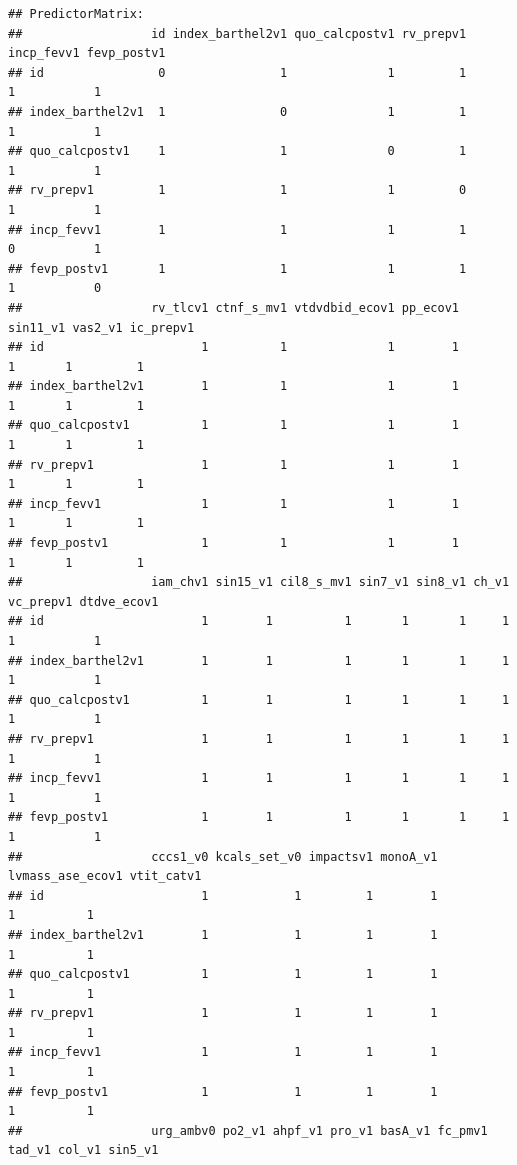 \documentclass[a4paper,10pt]{article}\usepackage[]{graphicx}\usepackage[]{xcolor}
\makeatletter
\newenvironment{kframe}{%
 \def\at@end@of@kframe{}%
 \ifinner\ifhmode%
  \def\at@end@of@kframe{\end{minipage}}%
  \begin{minipage}{\columnwidth}%
 \fi\fi%
 \def\FrameCommand##1{\hskip\@totalleftmargin \hskip-\fboxsep
 \colorbox{shadecolor}{##1}\hskip-\fboxsep
     \hskip-\linewidth \hskip-\@totalleftmargin \hskip\columnwidth}%
 \MakeFramed {\advance\hsize-\width
   \@totalleftmargin\z@ \linewidth\hsize
   \@setminipage}}%
 {\par\unskip\endMakeFramed%
 \at@end@of@kframe}
\newenvironment{knitrout}{}{} %
\makeatother
\begin{document}
\begin{knitrout}
\begin{kframe}
\begin{verbatim}
## PredictorMatrix:
##                  id index_barthel2v1 quo_calcpostv1 rv_prepv1 incp_fevv1 fevp_postv1
## id                0                1              1         1          1           1
## index_barthel2v1  1                0              1         1          1           1
## quo_calcpostv1    1                1              0         1          1           1
## rv_prepv1         1                1              1         0          1           1
## incp_fevv1        1                1              1         1          0           1
## fevp_postv1       1                1              1         1          1           0
##                  rv_tlcv1 ctnf_s_mv1 vtdvdbid_ecov1 pp_ecov1 sin11_v1 vas2_v1 ic_prepv1
## id                      1          1              1        1        1       1         1
## index_barthel2v1        1          1              1        1        1       1         1
## quo_calcpostv1          1          1              1        1        1       1         1
## rv_prepv1               1          1              1        1        1       1         1
## incp_fevv1              1          1              1        1        1       1         1
## fevp_postv1             1          1              1        1        1       1         1
##                  iam_chv1 sin15_v1 cil8_s_mv1 sin7_v1 sin8_v1 ch_v1 vc_prepv1 dtdve_ecov1
## id                      1        1          1       1       1     1         1           1
## index_barthel2v1        1        1          1       1       1     1         1           1
## quo_calcpostv1          1        1          1       1       1     1         1           1
## rv_prepv1               1        1          1       1       1     1         1           1
## incp_fevv1              1        1          1       1       1     1         1           1
## fevp_postv1             1        1          1       1       1     1         1           1
##                  cccs1_v0 kcals_set_v0 impactsv1 monoA_v1 lvmass_ase_ecov1 vtit_catv1
## id                      1            1         1        1                1          1
## index_barthel2v1        1            1         1        1                1          1
## quo_calcpostv1          1            1         1        1                1          1
## rv_prepv1               1            1         1        1                1          1
## incp_fevv1              1            1         1        1                1          1
## fevp_postv1             1            1         1        1                1          1
##                  urg_ambv0 po2_v1 ahpf_v1 pro_v1 basA_v1 fc_pmv1 tad_v1 col_v1 sin5_v1

\end{verbatim}
\end{kframe}
\end{knitrout}
\end{document}
